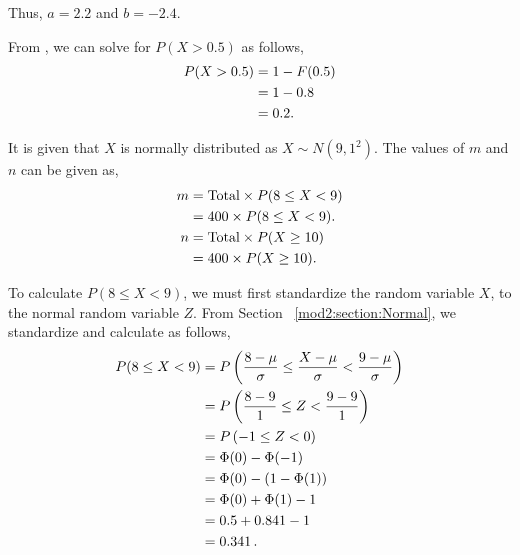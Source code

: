 \begin{subquestions}
\begin{subsubquestions}
Thus, $a=2.2$ and $b=-2.4$.


\subsubquestion

From , we can solve for $P(X>0.5)$ as follows,
\begin{align}
	P(X>0.5) & = 1 - F(0.5) \nonumber \\
	         & = 1 - 0.8 \nonumber \\
	         & = 0.2.
\end{align}

\end{subsubquestions}


\subquestion

\begin{subsubquestions}
	
\subsubquestion

It is given that $X$ is normally distributed as $X \sim N(9,1^2)$. The values of $m$ and $n$ can be given as,
\begin{align}
	m & = \text{Total} \times P(8 \leq X < 9) \nonumber \\
	  & = 400 \times P(8 \leq X < 9). \\
    n & = \text{Total} \times P(X \geq 10) \nonumber \\
      & = 400 \times P(X \geq 10). \label{2015:q4:MNeqn}
\end{align}
	
To calculate $P(8 \leq X < 9)$, we must first standardize the random variable $X$, to the normal random variable $Z$. From Section ~\ref{mod2:section:Normal}, we standardize and calculate as follows,
\begin{align}
	P(8 \leq X < 9) & = P\left(\frac{8- \mu}{\sigma} \leq \frac{X-\mu}{\sigma} < \frac{9-\mu}{\sigma} \right) \nonumber \\
	                & = P\left(\frac{8- 9}{1} \leq Z < \frac{9-9}{1} \right) \nonumber \\
	                & = P\left(-1 \leq Z < 0 \right) \nonumber \\
	                & = \Phi(0) - \Phi(-1) \nonumber \\
	                & = \Phi(0) - (1 - \Phi(1)) \nonumber \\
	                & = \Phi(0) + \Phi(1) - 1 \nonumber \\
	                & = 0.5 + 0.841 - 1 \nonumber \\
	                & = 0.341 \,. \label{2015:q4:Normal1}
\end{align}


\end{subsubquestions}
\end{subquestions}
